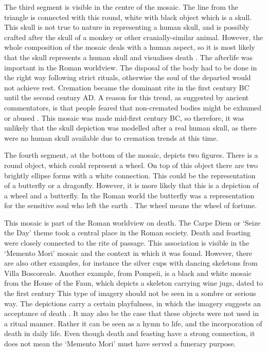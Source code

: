 	The third segment is visible in the centre of the mosaic. The line from the triangle is connected with this round, white with black object which is a skull. This skull is not true to nature in representing a human skull, and is possibly crafted after the skull of a monkey or other cranially-similar animal. However, the whole composition of the mosaic deals with a human aspect, so it is most likely that the skull represents a human skull and visualises death \parencite [99] {Cuomo_2007}. The afterlife was important in the Roman worldview. The disposal of the body had to be done in the right way following strict rituals, otherwise the soul of the departed would not achieve rest. Cremation became the dominant rite in the first century BC until the second century AD. A reason for this trend, as suggested by ancient commentators, is that people feared that non-cremated bodies might be exhumed or abused \parencite [80--82] {Hope_2009}. This mosaic was made mid-first century BC, so therefore, it was unlikely that the skull depiction was modelled after a real human skull, as there were no human skull available due to cremation trends at this time.
	
	The fourth segment, at the bottom of the mosaic, depicts two figures. There is a round object, which could represent a wheel. On top of this object there are two brightly ellipse forms with a white connection. This could be the representation of a butterfly or a dragonfly. However, it is more likely that this is a depiction of a wheel and a butterfly. In the Roman world the butterfly was a representation for the sensitive soul who left the earth \parencite [9] {Sogliano_1874}. The wheel means the wheel of fortune\parencite [99] {Cuomo_2007}.
	
This mosaic is part of the Roman worldview on death. The Carpe Diem or ‘Seize the Day’ theme took a central place in the Roman society. Death and feasting were closely connected to the rite of passage. This association is visible in the ‘Memento Mori’ mosaic and the context in which it was found. However, there are also other examples, for instance the silver cups with dancing skeletons from Villa Boscoreale. Another example, from Pompeii, is a black and white mosaic from the House of the Faun, which depicts a skeleton carrying wine jugs, dated to the first century \AD This type of imagery should not be seen in a sombre or serious way.  The depictions carry a certain playfulness, in which the imagery suggests an acceptance of death \parencite [25--27, 85--87]  {Hope_2009}. It may also be the case that these objects were not used in a ritual manner. Rather it can be seen as a hymn to life, and the incorporation of death in daily life. Even though death and feasting have a strong connection, it does not mean the ‘Memento Mori’ must have served a funerary purpose. 

